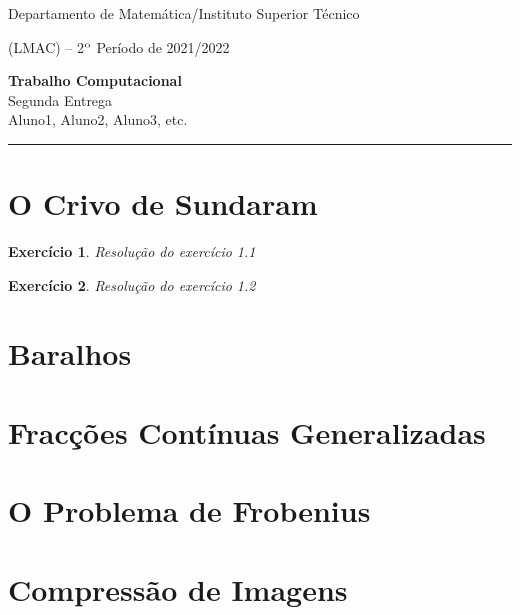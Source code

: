\documentclass{article}
\newtheorem{ex}{Exercício}[section]
\begin{document}

\noindent Departamento de  Matemática/Instituto Superior
Técnico \vspace{3mm}

 ({\small LMAC}) -- 2$^{\rm o}$ Período de 2021/2022

\bigskip

\begin{center}
{\bf\Large   Trabalho Computacional}\\ 
\smallskip
{\large Segunda Entrega}\\
\smallskip
Aluno1, Aluno2, Aluno3, etc.
\end{center}

\bigskip
\hrule

\section{O Crivo de Sundaram}

\begin{ex}
Resolução do exercício 1.1
\end{ex}

\begin{ex}
Resolução do exercício 1.2
\end{ex}

\section{Baralhos}

\section{Fracções Contínuas Generalizadas}

\section{O Problema de Frobenius}

\section{Compressão de Imagens}
\end{document}
